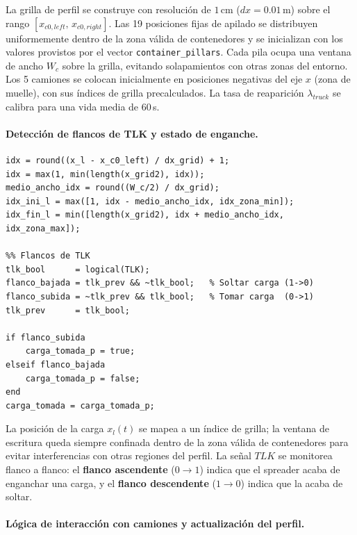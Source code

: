 \documentclass[12pt, a4paper]{article}
\begin{document}
La grilla de perfil se construye con resolución de $1\,\text{cm}$ ($dx = 0.01\,\text{m}$)
sobre el rango $[x_{c0,left},\, x_{c0,right}]$. Las 19 posiciones fijas de apilado se
distribuyen uniformemente dentro de la zona válida de contenedores y se inicializan con los
valores provistos por el vector \texttt{container\_pillars}. Cada pila ocupa una ventana de
ancho $W_c$ sobre la grilla, evitando solapamientos con otras zonas del entorno. Los 5
camiones se colocan inicialmente en posiciones negativas del eje $x$ (zona de muelle),
con sus índices de grilla precalculados. La tasa de reaparición $\lambda_{truck}$ se
calibra para una vida media de 60\,s.

\paragraph{Detección de flancos de TLK y estado de enganche.}\leavevmode

\begin{lstlisting}[style=matlab, caption={Detección de flancos de la señal $TLK$ y actualización de \texttt{carga\_tomada}.}, label=lst:perfil-suelo-tlk]
%% Indice de la carga y ventana de escritura
idx = round((x_l - x_c0_left) / dx_grid) + 1;
idx = max(1, min(length(x_grid2), idx));
medio_ancho_idx = round((W_c/2) / dx_grid);
idx_ini_l = max([1, idx - medio_ancho_idx, idx_zona_min]);
idx_fin_l = min([length(x_grid2), idx + medio_ancho_idx, idx_zona_max]);

%% Flancos de TLK
tlk_bool      = logical(TLK);
flanco_bajada = tlk_prev && ~tlk_bool;   % Soltar carga (1->0)
flanco_subida = ~tlk_prev && tlk_bool;   % Tomar carga  (0->1)
tlk_prev      = tlk_bool;

if flanco_subida
    carga_tomada_p = true;
elseif flanco_bajada
    carga_tomada_p = false;
end
carga_tomada = carga_tomada_p;
\end{lstlisting}

La posición de la carga $x_l(t)$ se mapea a un índice de grilla; la ventana de
escritura queda siempre confinada dentro de la zona válida de contenedores para
evitar interferencias con otras regiones del perfil. La señal $TLK$ se monitorea
flanco a flanco: el \textbf{flanco ascendente} ($0\!\to\!1$) indica que el spreader
acaba de enganchar una carga, y el \textbf{flanco descendente} ($1\!\to\!0$) indica
que la acaba de soltar.

\paragraph{Lógica de interacción con camiones y actualización del perfil.}\leavevmode
\end{document}
